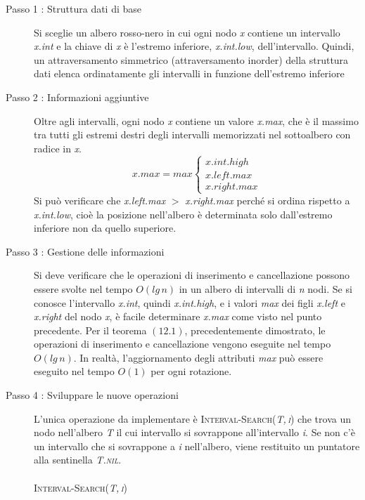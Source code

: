 \documentclass[10pt, a4paper]{report}
\begin{document}
\begin{description}
\item[Passo 1 : Struttura dati di base]Si sceglie un albero rosso-nero in cui ogni nodo \textit{x} contiene un intervallo \textit{x.int} e la chiave di \textit{x} è l'estremo inferiore, \textit{x.int.low}, dell'intervallo. Quindi, un attraversamento simmetrico (attraversamento inorder) della struttura dati elenca ordinatamente gli intervalli in funzione dell'estremo inferiore
\item[Passo 2 : Informazioni aggiuntive]Oltre agli intervalli, ogni nodo \textit{x} contiene un valore \textit{x.max}, che è il massimo tra tutti gli estremi destri degli intervalli memorizzati nel sottoalbero con radice in \textit{x}.
\begin{equation*}
x.max = max \left\{
\begin{array}{l}
x.int.high\\
x.left.max\\
x.right.max
\end{array}\right.
\end{equation*}
Si può verificare che \textit{x.left.max} $>$ \textit{x.right.max} perché si ordina rispetto a \textit{x.int.low}, cioè la posizione nell'albero è determinata solo dall'estremo inferiore non da quello superiore.
\item[Passo 3 : Gestione delle informazioni]Si deve verificare che le operazioni di inserimento e cancellazione possono essere svolte nel tempo $O(lg\,n)$ in un albero di intervalli di \textit{n} nodi. Se si conosce l'intervallo \textit{x.int}, quindi \textit{x.int.high}, e i valori \textit{max} dei figli \textit{x.left} e \textit{x.right} del nodo \textit{x}, è facile determinare \textit{x.max} come visto nel punto precedente. Per il teorema $(12.1)$, precedentemente dimostrato, le operazioni di inserimento e cancellazione vengono eseguite nel tempo $O(lg\,n)$. In realtà, l'aggiornamento degli attributi \textit{max} può essere eseguito nel tempo $O(1)$ per ogni rotazione.
\item[Passo 4 : Sviluppare le nuove operazioni]L'unica operazione da implementare è \textsc{Interval-Search(\textit{T,\,\textit{i}})} che trova un nodo nell'albero \textit{T} il cui intervallo si sovrappone all'intervallo \textit{i}. Se non c'è un intervallo che si sovrappone a \textit{i} nell'albero, viene restituito un puntatore alla sentinella \textit{T.\textsc{nil}}.\\\\
\textsc{Interval-Search(\textit{T,\,\textit{i}})}\\

\end{description}
\end{document}

